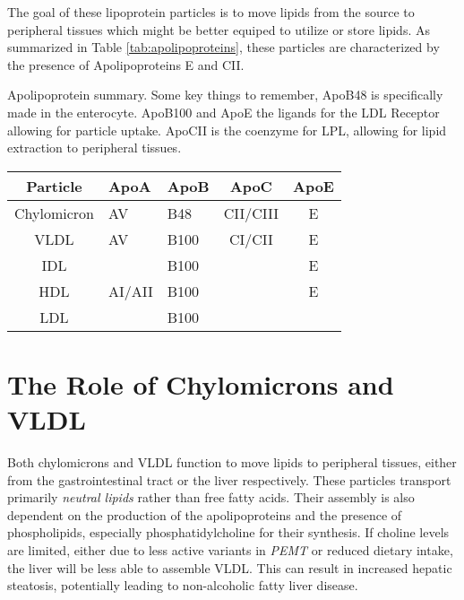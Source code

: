 \documentclass{tufte-handout}
\begin{document}
The goal of these lipoprotein particles is to move lipids from the source to peripheral tissues which might be better equiped to utilize or store lipids.  As summarized in Table \ref{tab:apolipoproteins}, these particles are characterized by the presence of Apolipoproteins E and CII.

\begin{margintable}
\centering
\caption{Apolipoprotein summary.  Some key things to remember, ApoB48 is specifically made in the enterocyte.  ApoB100 and ApoE the ligands for the LDL Receptor allowing for particle uptake.  ApoCII is the coenzyme for LPL, allowing for lipid extraction to peripheral tissues.}
\label{tab:apolipoproteins}
\begin{tabular}{@{}cllcc@{}}
\toprule
\textbf{Particle} & \textbf{ApoA} & \textbf{ApoB} & \textbf{ApoC} & \textbf{ApoE} \\ \midrule
Chylomicron       &  AV         & B48           & CII/CIII           & E             \\
VLDL              &   AV            & B100          & CI/CII        & E             \\
IDL               &                  & B100         &        &   E \\
HDL               & AI/AII          & B100          &               &             E  \\
LDL               &         & B100          &               &              
\end{tabular}
\end{margintable}
\section{The Role of Chylomicrons and VLDL}

Both chylomicrons and VLDL function to move lipids to peripheral tissues, either from the gastrointestinal tract or the liver respectively.  These particles transport primarily \emph{neutral lipids} rather than free fatty acids.  Their assembly is also dependent on the production of the apolipoproteins and the presence of phospholipids, especially phosphatidylcholine for their synthesis.   If choline levels are limited, either due to less active variants in \textit{PEMT} or reduced dietary intake, the liver will be less able to assemble VLDL.  This can result in increased hepatic steatosis, potentially leading to non-alcoholic fatty liver disease.
\end{document}
